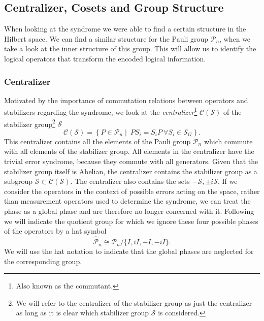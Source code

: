 \subsection{Centralizer, Cosets and Group Structure}\label{ssec:intro_centralizer} %

When looking at the syndrome we were able to find a certain structure in the Hilbert space. 
We can find a similar structure for the Pauli group $\mathcal{P}_n$, when we take a look at the inner structure of this group. %
This will allow us to identify the logical operators that transform the encoded logical information.

\subsubsection{Centralizer}\label{sssec:centralizer_intro_and_defintion}

Motivated by the importance of commutation relations between operators and stabilizers regarding the syndrome, we look at the \emph{centralizer}\footnote{
    Also known as the commutant.
    } $\mathcal{C}(\mathcal{S})$ of the stabilizer group\footnote{
    We will refer to the centralizer of the stabilizer group as just the centralizer as long as it is clear which stabilizer group $\mathcal{S}$ is considered.
    } $\mathcal{S}$
\begin{equation}
    \mathcal{C}(\mathcal{S}) = \left \{  P \in \mathcal{P}_n \mid \  P S_i = S_i P\  \forall S_i \in \mathcal{S}_G \right \}.
\end{equation}
This centralizer contains all the elements of the Pauli group $\mathcal{P}_n$ which commute with all elements of the stabilizer group.
All elements in the centralizer have the trivial error syndrome, because they commute with all generators.
Given that the stabilizer group itself is Abelian, the centralizer contains the stabilizer group as a subgroup $\mathcal{S} \subset \mathcal{C}(\mathcal{S})$.
The centralizer also contains the sets $-\mathcal{S}, \pm i \mathcal{S}$. 
If we consider the operators in the context of possible errors acting on the space, rather than measurement operators used to determine the syndrome, we can treat the phase as a global phase and are therefore no longer concerned with it.
Following \cite{gottesmann_book} we will indicate the quotient group for which we ignore these four possible phases of the operators by a hat symbol
\begin{equation}
    \hat{\mathcal{P}}_n \cong \mathcal{P}_n / \{I, iI, -I, -iI\}.
\end{equation}
We will use the hat notation to indicate that the global phases are neglected for the corresponding group.


